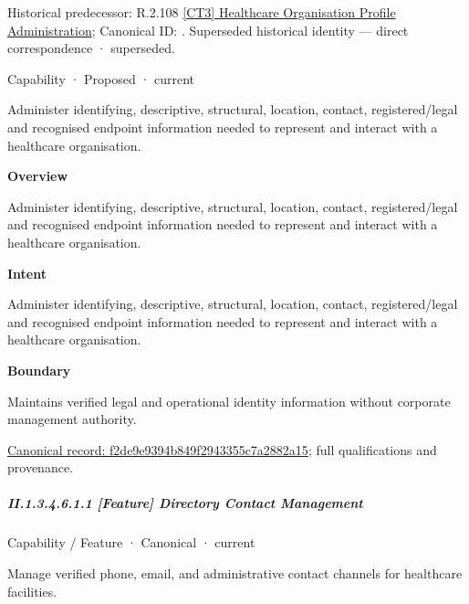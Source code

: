 {\small Historical predecessor: R.2.108 \hyperref[element:e485424b799c42aca7399d341ca02d0b]{[CT3] Healthcare Organisation Profile Administration}; Canonical ID: \texttt{}. Superseded historical identity — direct correspondence · superseded.}\par
\label{element:f2de9e9394b849f2943355c7a2882a15}
{\small Capability · Proposed · current}\par

Administer identifying, descriptive, structural, location, contact, registered/legal and recognised endpoint information needed to represent and interact with a healthcare organisation.



\textbf{Overview}



Administer identifying, descriptive, structural, location, contact, registered/legal and recognised endpoint information needed to represent and interact with a healthcare organisation.



\textbf{Intent}



Administer identifying, descriptive, structural, location, contact, registered/legal and recognised endpoint information needed to represent and interact with a healthcare organisation.



\textbf{Boundary}



Maintains verified legal and operational identity information without corporate management authority.


{\footnotesize \href{../../../../continuum/strategy/capability/f2de9e9394b849f2943355c7a2882a15.md}{Canonical record: f2de9e9394b849f2943355c7a2882a15}; full qualifications and provenance.}\par
\subparagraph*{II.1.3.4.6.1.1 [Feature] Directory Contact Management}
\label{navigation:II.1.3.4.6.1.1}

\label{element:1cdac17b7547448daa20b74ed45ec366}
{\small Capability / Feature · Canonical · current}\par

Manage verified phone, email, and administrative contact channels for healthcare facilities.



